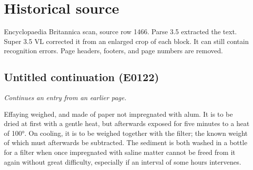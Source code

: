 \documentclass{article}
\begin{document}
\section*{Historical source}
Encyclopaedia Britannica scan, source row 1466. Parse 3.5 extracted the text. Super 3.5 VL corrected it from an enlarged crop of each block. It can still contain recognition errors.
Page headers, footers, and page numbers are removed.

\subsection*{Untitled continuation (E0122)}
\textit{Continues an entry from an earlier page.}

Effaying weighed, and made of paper not impregnated with alum. It is to be dried at first with a gentle heat, but afterwards exposed for five minutes to a heat of 100°. On cooling, it is to be weighed together with the filter; the known weight of which must afterwards be subtracted. The sediment is both washed in a bottle for a filter when once impregnated with saline matter cannot be freed from it again without great difficulty, especially if an interval of some hours intervenes.
\end{document}
